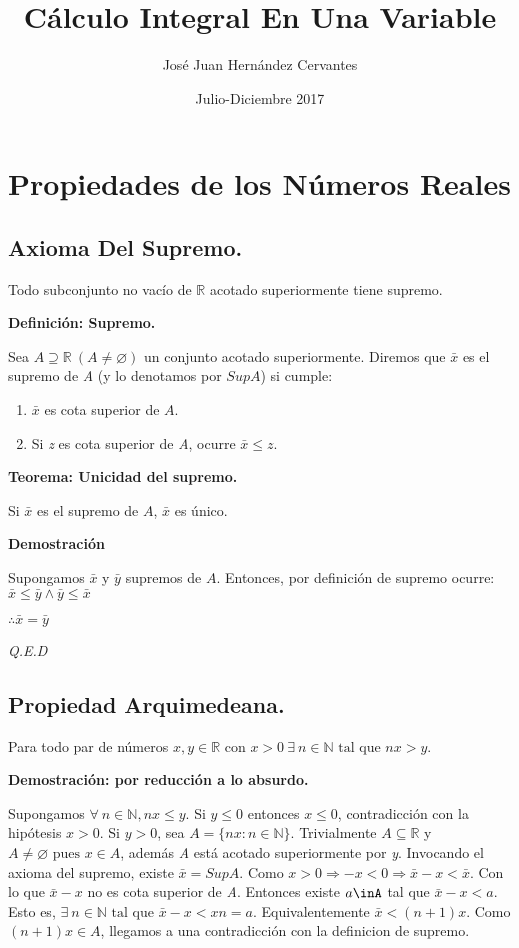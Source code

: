 \documentclass{book}
\title{Cálculo Integral En Una Variable}
\author{José Juan Hernández Cervantes}
\date{Julio-Diciembre 2017}
\begin{document}
\maketitle
\chapter{Propiedades de los Números Reales}
\section{Axioma Del Supremo.}
Todo subconjunto no vacío de $\mathbb{R}$ acotado superiormente tiene supremo.

\textbf{Definición: Supremo.}

Sea $A \supseteq \mathbb{R} \ (A \neq \varnothing)$ un conjunto acotado superiormente.
Diremos que $\bar{x}$ es el supremo de \textit{A} (y lo denotamos por $SupA$) si cumple:
\begin{enumerate}[1.]
\item $\bar{x}$  es cota superior de $A$.
\item Si \textit{z} es cota superior de \textit{A}, ocurre $\bar{x}\le z$.
\end{enumerate}
\textbf{Teorema: Unicidad del supremo.}

Si $\bar{x}$ es el supremo de $A$, $\bar{x}$ es único.

\textbf{Demostración}

Supongamos $\bar{x}$ y $\bar{y}$ supremos de $A$. Entonces, por definición de supremo ocurre:
$\bar{x}\le\bar{y}\land\bar{y}\le\bar{x}$

$\therefore \bar{x}=\bar{y}$

\textit{Q.E.D}

\section{Propiedad Arquimedeana.}

Para todo par de números $x,y\in \mathbb{R}\mbox{ con }x> 0 \ \exists \ n\in\mathbb{N}\mbox{ tal que }nx> y$.

\textbf{Demostración: por reducción a lo absurdo.}

Supongamos $\forall \ n\in\mathbb{N},nx\le{y}$.
Si $y\le{0}$ entonces $x\le{0}$, contradicción con la hipótesis $x>0$.
Si $y>0$, sea $A=\lbrace nx:n\in{\mathbb{N}}\rbrace$.
Trivialmente $A\subseteq{\mathbb{R}}$ y $ A\neq \varnothing\mbox{ pues }x\in A$, además \textit{A} está acotado superiormente por \textit{y}.
Invocando el axioma del supremo, existe $\bar{x}=SupA$.
Como $x>0 \Rightarrow -x<0\Rightarrow \bar{x}-x<\bar{x}$.
Con lo que $\bar{x}-x$ no es cota superior de \textit{A}.
Entonces existe $a\inA$ tal que $\bar{x}-x<a$.
Esto es, $\exists \ n\in{\mathbb{N}}\mbox{ tal que }\bar{x}-x<xn=a$. Equivalentemente $\bar{x}<(n+1)x$.
Como $(n+1)x\in{A}$, llegamos a una contradicción con la definicion de supremo.
\end{document}
